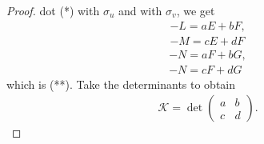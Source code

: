 \documentclass[a4paper]{article}
\begin{document}
\begin{prop}
\begin{proof}
dot (*) with $\sigma_u$ and with $\sigma_v$, we get
\begin{equation*}
\begin{aligned}
-L = aE+bF,\\
-M = cE+dF
\end{aligned}
\end{equation*}
\begin{equation*}
\begin{aligned}
-N=aF+bG,\\
-N=cF+dG
\end{aligned}
\end{equation*}
which is (**). Take the determinants to obtain
\begin{equation*}
\begin{aligned}
\mathcal{K} = \det \left(\begin{matrix}
a & b\\
c & d
\end{matrix}\right).
\end{aligned}
\end{equation*}
\end{proof}
\end{prop}
\end{document}
